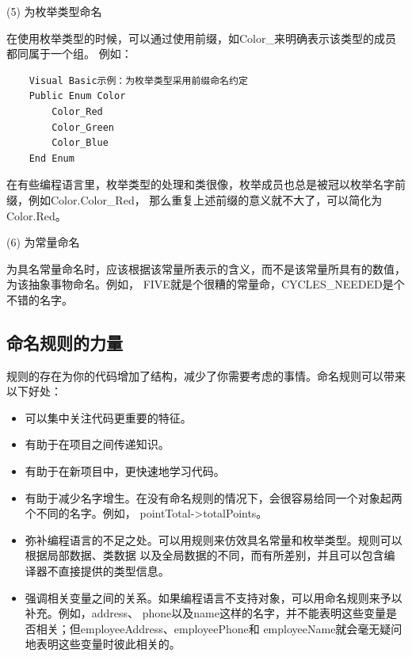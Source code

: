 \documentclass{article}
\begin{document}
\par
(5) 为枚举类型命名
\par
在使用枚举类型的时候，可以通过使用前缀，如Color\_来明确表示该类型的成员都同属于一个组。
例如：
\begin{lstlisting}
    Visual Basic示例：为枚举类型采用前缀命名约定
    Public Enum Color
        Color_Red
        Color_Green
        Color_Blue
    End Enum
\end{lstlisting}
在有些编程语言里，枚举类型的处理和类很像，枚举成员也总是被冠以枚举名字前缀，例如Color.Color\_Red，
那么重复上述前缀的意义就不大了，可以简化为Color.Red。

\par
(6) 为常量命名
\par
为具名常量命名时，应该根据该常量所表示的含义，而不是该常量所具有的数值，为该抽象事物命名。例如，
FIVE就是个很糟的常量命，CYCLES\_NEEDED是个不错的名字。

\subsection{命名规则的力量}
\par
规则的存在为你的代码增加了结构，减少了你需要考虑的事情。命名规则可以带来以下好处：
\begin{itemize}
    \item 可以集中关注代码更重要的特征。
    \item 有助于在项目之间传递知识。
    \item 有助于在新项目中，更快速地学习代码。
    \item 有助于减少名字增生。在没有命名规则的情况下，会很容易给同一个对象起两个不同的名字。例如，
    pointTotal->totalPoints。
    \item 弥补编程语言的不足之处。可以用规则来仿效具名常量和枚举类型。规则可以根据局部数据、类数据
    以及全局数据的不同，而有所差别，并且可以包含编译器不直接提供的类型信息。
    \item 强调相关变量之间的关系。如果编程语言不支持对象，可以用命名规则来予以补充。例如，address、
    phone以及name这样的名字，并不能表明这些变量是否相关；但employeeAddress、employeePhone和
    employeeName就会毫无疑问地表明这些变量时彼此相关的。
\end{itemize}
\end{document}
